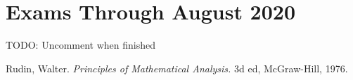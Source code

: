 \documentclass[english]{article}
\DeclareMathOperator{\<}{\langle}
\renewcommand{\>}{\rangle}
\theoremstyle{definition}
\begin{document}
\pagebreak

\section{Exams Through August 2020}
TODO: Uncomment when finished
% 

\pagebreak

\begin{thebibliography}{9}
    Rudin, Walter. \textit{Principles of Mathematical Analysis.} 3d ed, McGraw-Hill, 1976.
\end{thebibliography}
\end{document}
